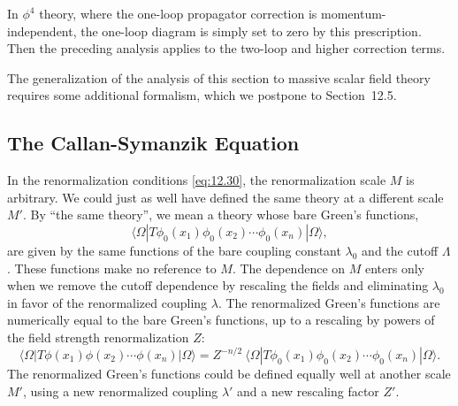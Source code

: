 In $\phi^4$ theory, where the one-loop propagator correction is
momentum-independent, the one-loop diagram is simply set to zero by this
prescription.  Then the preceding analysis applies to the two-loop and higher
correction terms.

The generalization of the analysis of this section to massive scalar field
theory requires some additional formalism, which we postpone to
Section~12.5.

\subsection{The Callan-Symanzik Equation}

In the renormalization conditions \eqref{eq:12.30}, the renormalization scale
$M$ is arbitrary.  We could just as well have defined the same theory at a
different scale $M'$.  By ``the same theory'', we mean a theory whose bare
Green's functions,
\begin{equation}
  \langle\Omega|T\phi_0(x_1)\phi_0(x_2)\cdots\phi_0(x_n)|\Omega\rangle ,
\end{equation}
are given by the same functions of the bare coupling constant $\lambda_0$ and
the cutoff $\Lambda$.  These functions make no reference to $M$.  The
dependence on $M$ enters only when we remove the cutoff dependence by
rescaling the fields and eliminating $\lambda_0$ in favor of the renormalized
coupling $\lambda$.  The renormalized Green's functions are numerically equal
to the bare Green's functions, up to a rescaling by powers of the field
strength renormalization $Z$:
\begin{equation}
  \langle\Omega|T\phi(x_1)\phi(x_2)\cdots\phi(x_n)|\Omega\rangle
  = Z^{-n/2}\ \langle\Omega|T\phi_0(x_1)\phi_0(x_2)\cdots\phi_0(x_n)
    |\Omega\rangle .
  \label{eq:12.35}
\end{equation}
The renormalized Green's functions could be defined equally well at another
scale $M'$, using a new renormalized coupling $\lambda'$ and a new rescaling
factor $Z'$.


